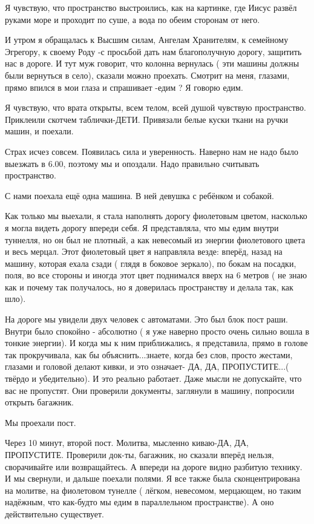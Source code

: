 Я чувствую, что пространство выстроились, как на картинке, где Иисус развёл
руками море и проходит по суше, а вода по обеим сторонам от него.

И утром я обращалась к Высшим силам, Ангелам Хранителям, к семейному Эгрегору,
к своему Роду -с просьбой дать нам благополучную дорогу, защитить нас в
дороге. И тут муж говорит, что колонна  вернулась ( эти машины должны были
вернуться в село), сказали можно проехать. Смотрит на меня, глазами, прямо
впился в мои глаза и спрашивает -едим ? Я говорю едим.

Я чувствую, что  врата открыты, всем телом, всей душой чувствую пространство.
Приклеили скотчем таблички-ДЕТИ.  Привязали белые куски ткани на ручки машин,
и поехали.

Страх исчез совсем.  Появилась сила и уверенность.  Наверно нам не надо было
выезжать в 6.00, поэтому мы и опоздали. Надо правильно считывать пространство. 

С нами поехала ещё одна машина. В ней девушка с ребёнком и собакой.

Как только мы выехали, я стала наполнять дорогу фиолетовым цветом, насколько я
могла видеть дорогу впереди себя. Я представляла, что мы едим внутри туннелля,
но он был не плотный, а как невесомый из энергии фиолетового цвета и весь
мерцал. Этот фиолетовый цвет я направляла везде: вперёд, назад на машину,
которая ехала сзади ( глядя в боковое зеркало),  по бокам на посадки, поля,  во
все стороны и иногда этот цвет поднимался  вверх на 6 метров ( не знаю как и
почему так получалось, но я доверилась пространству и делала так, как шло).

На дороге мы увидели двух человек с автоматами. Это был блок пост раши.  Внутри
было спокойно - абсолютно ( я уже наверно просто очень сильно вошла в тонкие
энергии). И когда мы к ним приближались, я представила, прямо в голове так
прокручивала, как бы объяснить...знаете,  когда без слов, просто жестами,
глазами и головой делают кивки, и это означает- ДА, ДА, ПРОПУСТИТЕ...( твёрдо и
убедительно). И это реально работает. Даже мысли не допускайте, что вас не
пропустят. Они проверили документы, заглянули в машину, попросили открыть
багажник. 

Мы проехали пост.

Через 10 минут, второй пост. Молитва, мысленно киваю-ДА, ДА, ПРОПУСТИТЕ.
Проверили док-ты, багажник, но сказали вперёд нельзя, сворачивайте или
возвращайтесь. А впереди на дороге видно разбитую технику. И мы свернули, и
дальше поехали полями. Я все также была сконцентрирована на молитве, на
фиолетовом тунелле ( лёгком, невесомом, мерцающем, но таким надёжным, что
как-будто мы едим в параллельном пространстве). А оно действительно существует.

